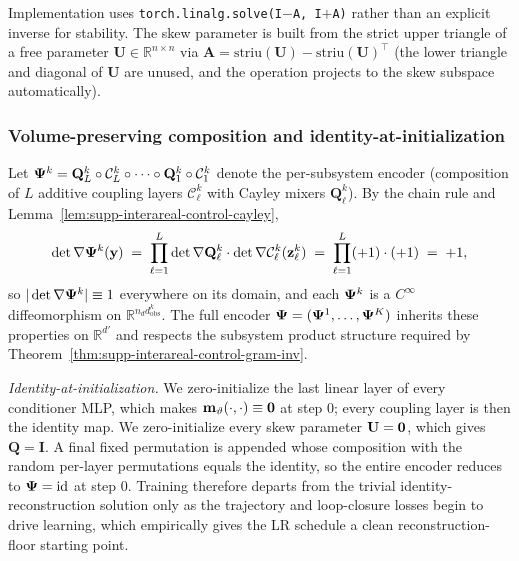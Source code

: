 Implementation uses \texttt{torch.linalg.solve(I$-$A, I$+$A)} rather than an explicit inverse for stability. The skew parameter is built from the strict upper triangle of a free parameter $\mathbf{U}\in\mathbb{R}^{n\times n}$ via $\mathbf{A}=\mathrm{striu}(\mathbf{U})-\mathrm{striu}(\mathbf{U})^{\!\top}$ (the lower triangle and diagonal of $\mathbf{U}$ are unused, and the operation projects to the skew subspace automatically).

\subsubsection{Volume-preserving composition and identity-at-initialization}\label{supp:interareal-control-composition}

Let $\vb{\Psi}^{k}=\mathbf{Q}^{k}_{L}\circ\mathcal{C}^{k}_{L}\circ\cdots\circ\mathbf{Q}^{k}_{1}\circ\mathcal{C}^{k}_{1}$ denote the per-subsystem encoder (composition of $L$ additive coupling layers $\mathcal{C}^{k}_{\ell}$ with Cayley mixers $\mathbf{Q}^{k}_{\ell}$). By the chain rule and Lemma~\ref{lem:supp-interareal-control-cayley},
\begin{equation}
\det\nabla\vb{\Psi}^{k}(\vb{y}) \;=\; \prod_{\ell=1}^{L}\det\nabla\mathbf{Q}^{k}_{\ell}\cdot\det\nabla\mathcal{C}^{k}_{\ell}(\vb{z}^{k}_{\ell}) \;=\; \prod_{\ell=1}^{L}(+1)\cdot(+1) \;=\; +1,
\end{equation}
so $|\det\nabla\vb{\Psi}^{k}|\equiv 1$ everywhere on its domain, and each $\vb{\Psi}^{k}$ is a $C^{\infty}$ diffeomorphism on $\mathbb{R}^{n_{d}d_{\mathrm{obs}}^{k}}$. The full encoder $\vb{\Psi}=(\vb{\Psi}^{1},\ldots,\vb{\Psi}^{K})$ inherits these properties on $\mathbb{R}^{d'}$ and respects the subsystem product structure required by Theorem~\ref{thm:supp-interareal-control-gram-inv}.

\emph{Identity-at-initialization.} We zero-initialize the last linear layer of every conditioner MLP, which makes $\vb{m}_{\vartheta}(\cdot,\cdot)\equiv\vb{0}$ at step 0; every coupling layer is then the identity map. We zero-initialize every skew parameter $\mathbf{U}=\vb{0}$, which gives $\mathbf{Q}=\mathbf{I}$. A final fixed permutation is appended whose composition with the random per-layer permutations equals the identity, so the entire encoder reduces to $\vb{\Psi}=\mathrm{id}$ at step 0. Training therefore departs from the trivial identity-reconstruction solution only as the trajectory and loop-closure losses begin to drive learning, which empirically gives the LR schedule a clean reconstruction-floor starting point.

